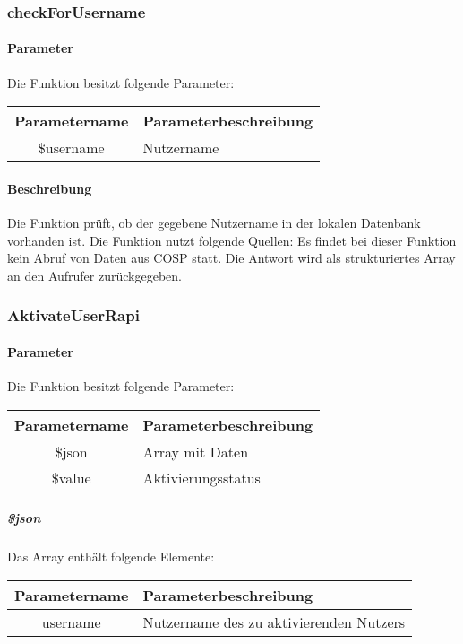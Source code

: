 \subsubsection{checkForUsername}
\paragraph{Parameter} Die Funktion besitzt folgende Parameter:
\begin{table}[H]
	\begin{tabular}{|c|p{11cm}|}
		\hline
		\textbf{Parametername} & \textbf{Parameterbeschreibung} \\ \hline
		\$username & Nutzername \\ \hline
	\end{tabular}
\end{table}
\paragraph{Beschreibung} Die Funktion prüft, ob der gegebene Nutzername in der lokalen Datenbank vorhanden ist. Die Funktion nutzt folgende Quellen: Es findet bei dieser Funktion kein Abruf von Daten aus {\glqq COSP\grqq} statt. Die Antwort wird als strukturiertes Array an den Aufrufer zurückgegeben.
\subsubsection{AktivateUserRapi}
\paragraph{Parameter} Die Funktion besitzt folgende Parameter:
\begin{table}[H]
	\begin{tabular}{|c|p{11cm}|}
		\hline
		\textbf{Parametername} & \textbf{Parameterbeschreibung} \\ \hline
		\$json  & Array mit Daten \\ \hline
		\$value & Aktivierungsstatus \\ \hline
	\end{tabular}
\end{table}
\subparagraph{\$json}Das Array enthält folgende Elemente:
\begin{table}[H]
	\begin{tabular}{|c|p{11cm}|}
		\hline
		\textbf{Parametername} & \textbf{Parameterbeschreibung} \\ \hline
		username & Nutzername des zu aktivierenden Nutzers \\ \hline
	\end{tabular}
\end{table}
